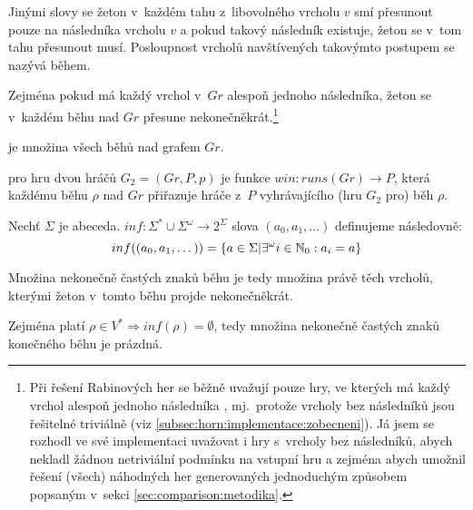 \begin{informal}
Jinými slovy se žeton v~každém tahu z~libovolného vrcholu $v$ smí přesunout pouze na následníka vrcholu $v$ a pokud takový následník existuje, žeton se v~tom tahu přesunout musí. Posloupnost vrcholů navštívených takovýmto postupem se nazývá během.

Zejména pokud má každý vrchol v~$Gr$ alespoň jednoho následníka, žeton se v~každém běhu nad $Gr$ přesune nekonečněkrát.\footnote{Při řešení Rabinových her se běžně uvažují pouze hry, ve kterých má každý vrchol alespoň jednoho následníka \cite{Horn2005}, mj.~protože vrcholy bez následníků jsou řešitelné triviálně (viz \ref{subsec:horn:implementace:zobecneni}). Já jsem se rozhodl ve své implementaci uvažovat i hry s~vrcholy bez následníků, abych nekladl žádnou netriviální podmínku na vstupní hru a zejména abych umožnil řešení (všech) náhodných her generovaných jednoduchým způsobem popsaným v~sekci \ref{sec:comparison:metodika}.}
\end{informal}
\begin{definition}
 je množina všech běhů nad grafem $Gr$.
\end{definition}
\begin{definition}
 pro hru dvou hráčů $G_2 = (Gr, P, p)$ je funkce $win: runs(Gr) \rightarrow P$, která každému běhu $\rho$ nad $Gr$ přiřazuje hráče z~$P$ vyhrávajícího (hru $G_2$ pro) běh $\rho$.
\end{definition}
\begin{definition}
Nechť $\Sigma$ je abeceda.  $inf: \Sigma^* \cup \Sigma^\omega \rightarrow 2^\Sigma$ slova $(a_0, a_1, \dotsc)$ definujeme následovně:
\begin{equation}
inf((a_0, a_1, \dotsc)) = \{a \in \Sigma | \exists^\omega i \in \mathbb{N}_0: a_i = a\}
\end{equation}
\end{definition}
\begin{informal}
Množina nekonečně častých znaků běhu je tedy množina právě těch vrcholů, kterými žeton v~tomto běhu projde nekonečněkrát.
\end{informal}

Zejména platí $\rho \in V^* \Rightarrow inf(\rho) = \emptyset$, tedy množina nekonečně častých znaků konečného běhu je prázdná.

